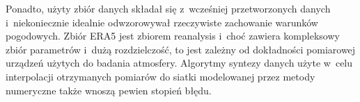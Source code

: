 Ponadto, użyty zbiór danych składał się z~wcześniej przetworzonych danych i~niekoniecznie idealnie
odwzorowywał rzeczywiste zachowanie warunków pogodowych. Zbiór ERA5 jest zbiorem reanalysis i~choć
zawiera kompleksowy zbiór parametrów i~dużą rozdzielczość, to jest zależny od dokładności pomiarowej
urządzeń użytych do badania atmosfery. Algorytmy syntezy danych użyte w~celu interpolacji otrzymanych
pomiarów do siatki modelowanej przez metody numeryczne także wnoszą pewien stopień błędu.



